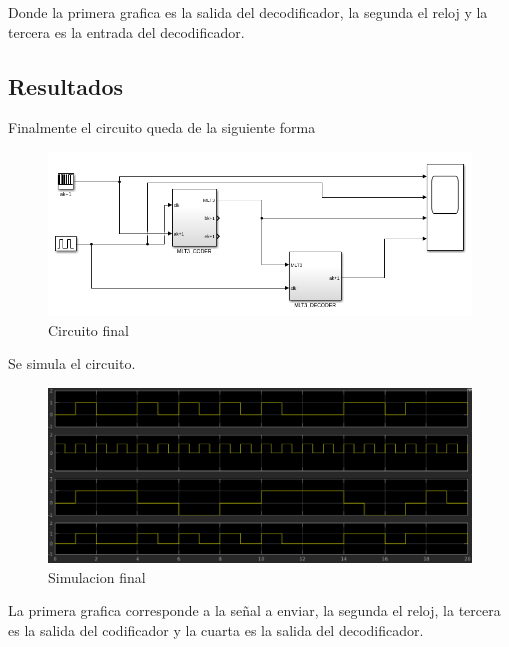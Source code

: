 Donde la primera grafica es la salida del decodificador, la segunda el reloj y la tercera es la entrada del decodificador.

\subsection{Resultados}

Finalmente el circuito queda de la siguiente forma

\begin{figure}[H]
    \centering
    \includegraphics[width=1\textwidth]{laboratorioMLT3/imagenes/circuitoFinal.PNG}
    \caption{\label{}Circuito final}
\end{figure}

Se simula el circuito.

\begin{figure}[H]
    \centering
    \includegraphics[width=1\textwidth]{laboratorioMLT3/imagenes/simulacionFinal.PNG}
    \caption{\label{}Simulacion final}
\end{figure}

La primera grafica corresponde a la señal a enviar, la segunda el reloj, la tercera es la salida del codificador y la cuarta es la salida del decodificador.